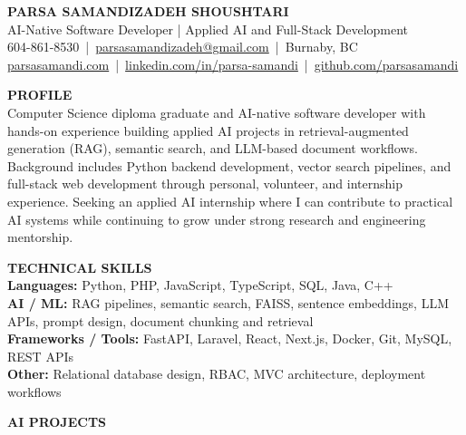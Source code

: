 \documentclass[10pt,letterpaper]{article}
\begin{document}
\begin{center}
    {\Large \textbf{PARSA SAMANDIZADEH SHOUSHTARI}}\\[3pt]
    AI-Native Software Developer | Applied AI and Full-Stack Development \\[6pt]
    604-861-8530 \,|\, \href{mailto:parsasamandizadeh@gmail.com}{parsasamandizadeh@gmail.com} \,|\, Burnaby, BC\\
    \href{https://parsasamandi.com}{parsasamandi.com} \,|\, 
    \href{https://www.linkedin.com/in/parsa-samandi/}{linkedin.com/in/parsa-samandi} \,|\, 
    \href{https://github.com/parsasamandi}{github.com/parsasamandi}
\end{center}

\vspace{4pt}

\textbf{PROFILE}\\[4pt]
Computer Science diploma graduate and AI-native software developer with hands-on experience building applied AI projects in retrieval-augmented generation (RAG), semantic search, and LLM-based document workflows. Background includes Python backend development, vector search pipelines, and full-stack web development through personal, volunteer, and internship experience. Seeking an applied AI internship where I can contribute to practical AI systems while continuing to grow under strong research and engineering mentorship.

\vspace{6pt}

\textbf{TECHNICAL SKILLS}\\[4pt]
\textbf{Languages:} Python, PHP, JavaScript, TypeScript, SQL, Java, C++\\
\textbf{AI / ML:} RAG pipelines, semantic search, FAISS, sentence embeddings, LLM APIs, prompt design, document chunking and retrieval\\
\textbf{Frameworks / Tools:} FastAPI, Laravel, React, Next.js, Docker, Git, MySQL, REST APIs\\
\textbf{Other:} Relational database design, RBAC, MVC architecture, deployment workflows

\vspace{6pt}

\textbf{AI PROJECTS}\\[4pt]
\end{document}
